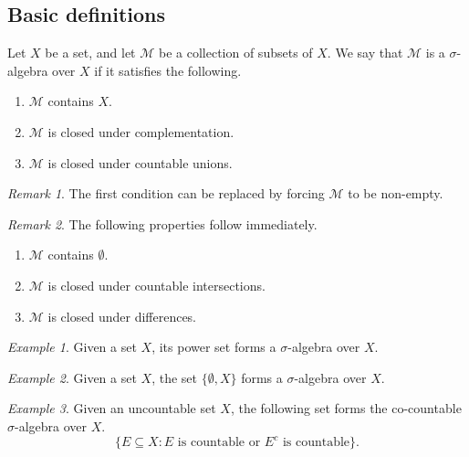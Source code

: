 \documentclass[11pt]{article}
\newcommand{\M}{\mathcal{M}}
\theoremstyle{definition}
\theoremstyle{remark}
\newtheorem*{remark}{Remark}
\newtheorem*{example}{Example}
\numberwithin{equation}{section}
\begin{document}
    \subsection{Basic definitions}

    \begin{definition}
        Let $X$ be a set, and let $\M$ be a collection of subsets of $X$. We say
        that $\M$ is a $\sigma$-algebra over $X$ if it satisfies the following.
        \begin{enumerate}
            \itemsep0em
            \item $\M$ contains $X$.
            \item $\M$ is closed under complementation.
            \item $\M$ is closed under countable unions.
        \end{enumerate}
        \begin{remark}
            The first condition can be replaced by forcing $\M$ to be non-empty.
        \end{remark}
        \begin{remark}
            The following properties follow immediately.
            \begin{enumerate}
                \itemsep0em
                \item $\M$ contains $\emptyset$.
                \item $\M$ is closed under countable intersections.
                \item $\M$ is closed under differences.
            \end{enumerate}
        \end{remark}
    \end{definition}

    \begin{example}
        Given a set $X$, its power set forms a $\sigma$-algebra over $X$.
    \end{example}
    \begin{example}
        Given a set $X$, the set $\{\emptyset, X\}$ forms a $\sigma$-algebra over
        $X$.
    \end{example}
    \begin{example}
        Given an uncountable set $X$, the following set forms the co-countable
        $\sigma$-algebra over $X$. \[
            \{E \subseteq X : E\text{ is countable or } E^c\text{ is countable}\}.
        \]
    \end{example}
\end{document}
